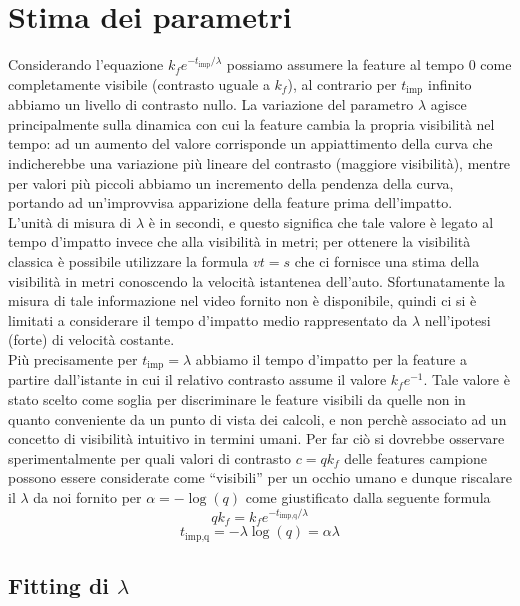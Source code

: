 \documentclass[12pt]{report}
\begin{document}
\section{Stima dei parametri}
\label{sect:stima}

\noindent Considerando l'equazione $k_fe^{-t_{\text{imp}}/\lambda}$ possiamo assumere la feature al tempo $0$ come completamente visibile (contrasto uguale a $k_f$), al contrario per $t_{\text{imp}}$ infinito abbiamo un livello di contrasto nullo. La variazione del parametro $\lambda$ agisce principalmente sulla dinamica con cui la feature cambia la propria visibilit\`a nel tempo: ad un aumento del valore corrisponde un appiattimento della curva che indicherebbe una variazione pi\`u lineare del contrasto (maggiore visibilit\`a), mentre per valori pi\`u piccoli abbiamo un incremento della pendenza della curva, portando ad un'improvvisa apparizione della feature prima dell'impatto. \\

\noindent L'unit\`a di misura di $\lambda$ \`e in secondi, e questo significa che tale valore \`e legato al tempo d'impatto invece che alla visibilit\`a in metri; per ottenere la visibilit\`a classica \`e possibile utilizzare la formula $vt=s$ che ci fornisce una stima della visibilit\`a in metri conoscendo la velocit\`a istantenea dell'auto. Sfortunatamente la misura di tale informazione nel video fornito non \`e disponibile, quindi ci si \`e limitati a considerare il tempo d'impatto medio rappresentato da $\lambda$ nell'ipotesi (forte) di velocit\`a costante.\\

\noindent Pi\`u precisamente per $t_{\text{imp}}=\lambda$ abbiamo il tempo d'impatto per la feature a partire dall'istante in cui il relativo contrasto assume il valore $k_fe^{-1}$. Tale valore \`e stato scelto come soglia per discriminare le feature visibili da quelle non in quanto conveniente da un punto di vista dei calcoli, e non perch\`e associato ad un concetto di visibilit\`a intuitivo in termini umani. Per far ci\`o si dovrebbe osservare sperimentalmente per quali valori di contrasto $c=qk_f$ delle features campione possono essere considerate come ``visibili'' per un occhio umano e dunque riscalare il $\lambda$ da noi fornito per $\alpha=-\log\left(q\right)$ come giustificato dalla seguente formula $$qk_f = k_fe^{-t_{\text{imp,q}}/\lambda}$$ $$t_{\text{imp,q}} = -\lambda\log \left(q\right) = \alpha\lambda$$


\subsection{Fitting di $\lambda$}
\label{sect:fit}
\end{document}
